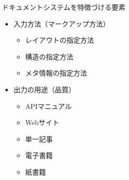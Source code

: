 \begin{frame}[t]{\inhibitglue ドキュメントシステムを特徴づける要素}
  \sffamily

  \begin{itemize}
    \item 入力方法（マークアップ方法）\\
      \begin{itemize}
        \item レイアウトの指定方法
        \item 構造の指定方法
        \item メタ情報の指定方法
      \end{itemize}
    \item 出力の用途（品質）\\
      \begin{itemize}
        \item APIマニュアル
        \item Webサイト
        \item 単一記事
        \item 電子書籍
        \item 紙書籍
      \end{itemize}
  \end{itemize}

\end{frame}


